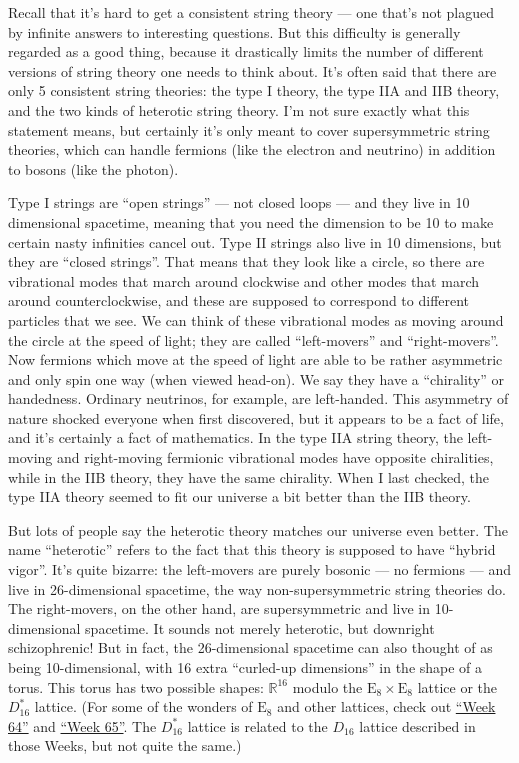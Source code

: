 \documentclass{article}
\begin{document}
Recall that it's hard to get a consistent string theory --- one that's
not plagued by infinite answers to interesting questions. But this
difficulty is generally regarded as a good thing, because it drastically
limits the number of different versions of string theory one needs to
think about. It's often said that there are only 5 consistent string
theories: the type I theory, the type IIA and IIB theory, and the two
kinds of heterotic string theory. I'm not sure exactly what this
statement means, but certainly it's only meant to cover supersymmetric
string theories, which can handle fermions (like the electron and
neutrino) in addition to bosons (like the photon).

Type I strings are ``open strings'' --- not closed loops --- and they
live in 10 dimensional spacetime, meaning that you need the dimension to
be 10 to make certain nasty infinities cancel out. Type II strings also
live in 10 dimensions, but they are ``closed strings''. That means that
they look like a circle, so there are vibrational modes that march
around clockwise and other modes that march around counterclockwise, and
these are supposed to correspond to different particles that we see. We
can think of these vibrational modes as moving around the circle at the
speed of light; they are called ``left-movers'' and ``right-movers''.
Now fermions which move at the speed of light are able to be rather
asymmetric and only spin one way (when viewed head-on). We say they have
a ``chirality'' or handedness. Ordinary neutrinos, for example, are
left-handed. This asymmetry of nature shocked everyone when first
discovered, but it appears to be a fact of life, and it's certainly a
fact of mathematics. In the type IIA string theory, the left-moving and
right-moving fermionic vibrational modes have opposite chiralities,
while in the IIB theory, they have the same chirality. When I last
checked, the type IIA theory seemed to fit our universe a bit better
than the IIB theory.

But lots of people say the heterotic theory matches our universe even
better. The name ``heterotic'' refers to the fact that this theory is
supposed to have ``hybrid vigor''. It's quite bizarre: the left-movers
are purely bosonic --- no fermions --- and live in 26-dimensional
spacetime, the way non-supersymmetric string theories do. The
right-movers, on the other hand, are supersymmetric and live in 10-
dimensional spacetime. It sounds not merely heterotic, but downright
schizophrenic! But in fact, the 26-dimensional spacetime can also
thought of as being 10-dimensional, with 16 extra ``curled-up
dimensions'' in the shape of a torus. This torus has two possible
shapes: \(\mathbb{R}^16\) modulo the
\(\mathrm{E}_8 \times \mathrm{E}_8\) lattice or the \(D_{16}^*\)
lattice. (For some of the wonders of \(\mathrm{E}_8\) and other
lattices, check out \protect\hyperlink{week64}{``Week 64''} and
\protect\hyperlink{week65}{``Week 65''}. The \(D_{16}^*\) lattice is
related to the \(D_{16}\) lattice described in those Weeks, but not
quite the same.)
\end{document}
